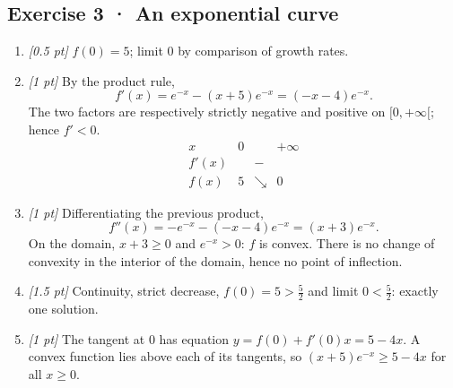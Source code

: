 \subsection*{Exercise 3 · An exponential curve}\begin{enumerate}

\item \textit{[0.5 pt]} $f(0)=5$; limit $0$ by comparison of growth rates.

\item \textit{[1 pt]} By the product rule,
\[f'(x)=e^{-x}-(x+5)e^{-x}=(-x-4)e^{-x}.\]
The two factors are respectively strictly negative and positive on $[0,+\infty[$; hence $f'<0$.
\[\begin{array}{c|ccc}x&0&&+\infty\\\hline f'(x)&&-&\\\hline f(x)&5&\searrow&0\end{array}\]

\item \textit{[1 pt]} Differentiating the previous product,
\[f''(x)=-e^{-x}-(-x-4)e^{-x}=(x+3)e^{-x}.\]
On the domain, $x+3\ge0$ and $e^{-x}>0$: $f$ is convex. There is no change of convexity in the interior of the domain, hence no point of inflection.

\item \textit{[1.5 pt]} Continuity, strict decrease, $f(0)=5>\frac{5}{2}$ and limit $0<\frac{5}{2}$: exactly one solution.

\item \textit{[1 pt]} The tangent at $0$ has equation $y=f(0)+f'(0)x=5-4x$. A convex function lies above each of its tangents, so $(x+5)e^{-x}\ge 5-4x$ for all $x\ge0$.

\end{enumerate}

